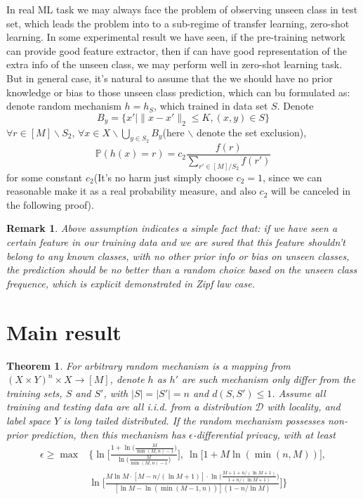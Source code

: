 \documentclass[12pt]{article}
\newtheorem{theorem}{Theorem}
\numberwithin{theorem}{section} %
\numberwithin{definition}{section} %
\numberwithin{assumption}{section} %
\numberwithin{lemma}{section} %
\newtheorem{remark}{Remark}
\numberwithin{remark}{section} %
\numberwithin{prop}{section} %
\numberwithin{corollary}{section} %
\numberwithin{example}{section} %
\numberwithin{question}{section} %
\numberwithin{problem}{section} %
\numberwithin{conjecture}{section} %
\numberwithin{append}{section} %
\numberwithin{property}{section} %
\def\P{{\mathbb P}}     %
\def\D{{\mathcal{D}}}     %
\begin{document}
In real ML task we may always face the problem of observing unseen class in test set, which leads the problem into to a sub-regime of transfer learning, zero-shot learning. In some experimental result we have seen, if the pre-training network can provide good feature extractor, then if can have good representation of the extra info of the unseen class, we may perform well in zero-shot learning task. But in general case, it's natural to assume that the we should have no prior knowledge or bias to those unseen class prediction, which can bu formulated as: denote random mechanism $h=h_S$, which trained in data set $S$. Denote 
\begin{equation}
	B_{y}=\{x'| \lVert x-x'\rVert_2\le K, (x,y)\in S\}
\end{equation}
$\forall r\in [M]\backslash S_2$, $\forall x\in X\backslash\bigcup\limits_{y\in S_2} B_y$(here $\backslash$ denote the set exclusion),
\begin{equation}
	\P(h(x)=r)=c_2\frac{f(r)}{\sum\limits_{r'\in [M]/S_2}f(r')} 
\end{equation}
for some constant $c_2$(It's no harm just simply choose $c_2=1$, since we can reasonable make it as a real probability measure, and also $c_2$ will be canceled in the following proof). 
\begin{remark}
	Above assumption indicates a simple fact that: if we have seen a certain feature in our training data and we are sured that this feature shouldn't belong to any known classes, with no other prior info or bias on unseen classes, the prediction should be no better than a random choice based on the unseen class frequence, which is explicit demonstrated in Zipf law case.
\end{remark} 
	
\section{Main result}
	
	\begin{theorem}
		For arbitrary random mechanism is a mapping from $(X\times Y)^n\times X\to [M]$, denote $h$ as $h'$ are such mechanism only differ from the training sets, $S$ and $S'$, with $|S|=|S'|=n$ and $d(S,S')\le 1$. Assume all training and testing data are all i.i.d. from a distribution $\D$ with locality, and 
		 label space $Y$ is long tailed distributed. If the random mechanism possesses non-prior prediction, then this mechanism has $\epsilon$-differential privacy, with at least
		\begin{equation}
			\begin{aligned}
				\epsilon \ge\max&\Bigg\{\ln\bigg[\frac{1+\ln \big(\frac{M}{\min(M,n)-1}\big)}{\ln \big(\frac{M}{\min(M,n)-1}\big)}\bigg],\ \ln\bigg[ 1+ M\ln(\min(n,M))	\bigg],\\
				& \ln \Bigg[\frac{M\ln M\cdot[M - n/(\ln M +1)]\cdot \ln\bigg(\frac{M+1+n/(\ln M +1)}{1+ n/(\ln M +1)}\bigg)}{[\ln M -\ln (\min(M-1,n))] (1-n/\ln M)} \Bigg]\Bigg\} 
			\end{aligned}
		\end{equation}
	\end{theorem}
	
\end{document}
